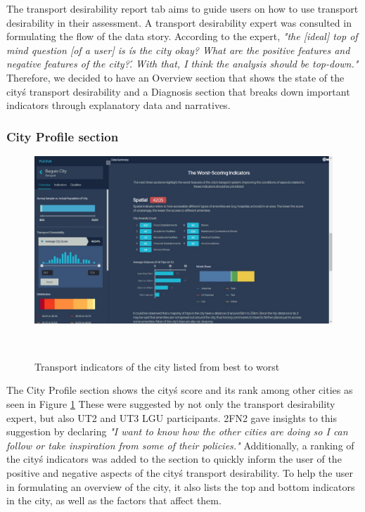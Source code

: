 \documentclass{sigchi}
\begin{document}
The transport desirability report tab aims to guide users on how to use transport desirability in their assessment. A transport desirability expert was consulted in formulating the flow of the data story. According to the expert, \textit{"the [ideal] top of mind question [of a user] is \'is the city okay? What are the positive features and negative features of the city?\'. With that, I think the analysis should be top-down."} Therefore, we decided to have an Overview section that shows the state of the city\'s transport desirability and a Diagnosis section that breaks down important indicators through explanatory data and narratives.

\subsubsection{City Profile section}
\begin{figure}
\centering
  \includegraphics[width=0.9\columnwidth]{figures/latest-screens/city-1.jpg}
  \caption{Transport indicators of the city listed from best to worst}~\label{fig:CityProf}
\end{figure}

The City Profile section shows the city\'s score and its rank among other cities as seen in Figure \ref{fig:CityProf} These were suggested by not only the transport desirability expert, but also UT2 and UT3 LGU participants. 2FN2 gave insights to this suggestion by declaring \textit{"I want to know how the other cities are doing so I can follow or take inspiration from some of their policies."} Additionally, a ranking of the city\'s indicators was added to the section to quickly inform the user of the positive and negative aspects of the city\'s transport desirability. To help the user in formulating an overview of the city, it also lists the top and bottom indicators in the city, as well as the factors that affect them.
\end{document}
